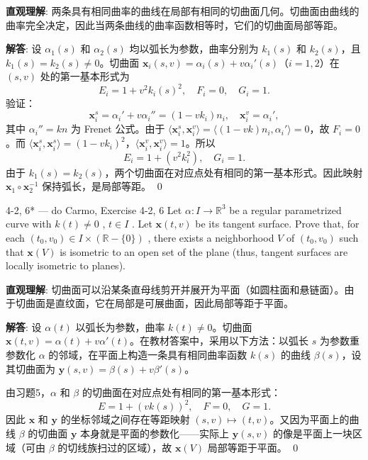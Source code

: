 \begin{solution}
\textbf{直观理解}: 两条具有相同曲率的曲线在局部有相同的切曲面几何。切曲面由曲线的曲率完全决定，因此当两条曲线的曲率函数相等时，它们的切曲面局部等距。

\textbf{解答}: 设 $\alpha_1(s)$ 和 $\alpha_2(s)$ 均以弧长为参数，曲率分别为 $k_1(s)$ 和 $k_2(s)$，且 $k_1(s)=k_2(s)\neq 0$。切曲面 $\mathbf{x}_i(s,v) = \alpha_i(s)+v\alpha_i'(s)$（$i=1,2$）在 $(s,v)$ 处的第一基本形式为
\[
E_i = 1+v^2k_i(s)^2,\quad F_i = 0,\quad G_i = 1.
\]
验证：
\[
\mathbf{x}_i^s = \alpha_i'+v\alpha_i'' = (1-vk_i)n_i,\quad
\mathbf{x}_i^v = \alpha_i',
\]
其中 $\alpha_i'' = kn$ 为 Frenet 公式。由于 $\langle\mathbf{x}_i^s,\mathbf{x}_i^v\rangle = \langle(1-vk)n_i,\alpha_i'\rangle = 0$，故 $F_i=0$。而 $\langle\mathbf{x}_i^s,\mathbf{x}_i^s\rangle = (1-vk_i)^2$，$\langle\mathbf{x}_i^v,\mathbf{x}_i^v\rangle = 1$。所以
\[
E_i = 1+(v^2k_i^2),\quad G_i = 1.
\]
由于 $k_1(s)=k_2(s)$，两个切曲面在对应点处有相同的第一基本形式。因此映射 $\mathbf{x}_1\circ\mathbf{x}_2^{-1}$ 保持弧长，是局部等距。
\qed
\end{solution}

\begin{exercise}{4-2, 6* — do Carmo, Exercise 4-2, 6}
Let $\alpha \colon I \to \mathbb{R}^3$ be a regular parametrized curve with $k(t) \neq 0$ , $t \in I$ . Let $\mathbf{x}(t, v)$ be its tangent surface. Prove that, for each $(t_0, v_0) \in I \times (\mathbb{R} - \{0\})$ , there exists a neighborhood $V$ of $(t_0, v_0)$ such that $\mathbf{x}(V)$ is isometric to an open set of the plane (thus, tangent surfaces are locally isometric to planes).
\end{exercise}

\begin{solution}
\textbf{直观理解}: 切曲面可以沿某条直母线剪开并展开为平面（如圆柱面和悬链面）。由于切曲面是直纹面，它在局部是可展曲面，因此局部等距于平面。

\textbf{解答}: 设 $\alpha(t)$ 以弧长为参数，曲率 $k(t)\neq 0$。切曲面 $\mathbf{x}(t,v) = \alpha(t)+v\alpha'(t)$。在教材答案中，采用以下方法：以弧长 $s$ 为参数重参数化 $\alpha$ 的邻域，在平面上构造一条具有相同曲率函数 $k(s)$ 的曲线 $\beta(s)$，设其切曲面为 $\mathbf{y}(s,v) = \beta(s)+v\beta'(s)$。

由习题5，$\alpha$ 和 $\beta$ 的切曲面在对应点处有相同的第一基本形式：
\[
E = 1+(vk(s))^2,\quad F = 0,\quad G = 1.
\]
因此 $\mathbf{x}$ 和 $\mathbf{y}$ 的坐标邻域之间存在等距映射 $(s,v)\mapsto(t,v)$。又因为平面上的曲线 $\beta$ 的切曲面 $\mathbf{y}$ 本身就是平面的参数化——实际上 $\mathbf{y}(s,v)$ 的像是平面上一块区域（可由 $\beta$ 的切线族扫过的区域），故 $\mathbf{x}(V)$ 局部等距于平面。
\qed
\end{solution}

